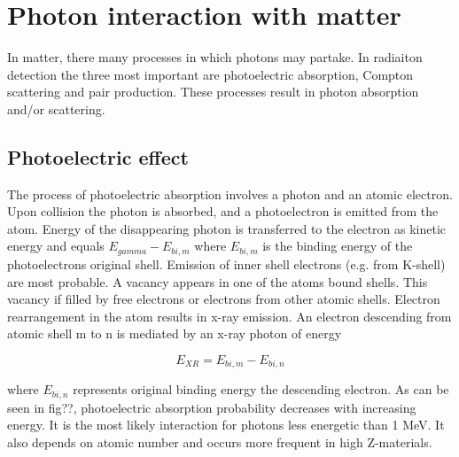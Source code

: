 \section{Photon interaction with matter}
In matter, there many processes in which photons may partake. In radiaiton detection the three most important are photoelectric absorption, Compton scattering and pair production. These processes result in photon absorption and/or scattering.

\subsection{Photoelectric effect}
The process of photoelectric absorption involves a photon and an atomic electron. Upon collision the photon is absorbed, and a photoelectron is emitted from the atom. Energy of the disappearing photon is transferred to the electron as kinetic energy and equals $E_{gamma}-E_{bi,m}$
where $E_{bi,m}$ is the binding energy of the photoelectrons original shell. Emission of inner shell electrons (e.g. from K-shell) are most probable.
A vacancy appears in one of the atoms bound shells. This vacancy if filled by free electrons or electrons from other atomic shells. Electron rearrangement in the atom results in x-ray emission. An electron descending from atomic shell m to n is mediated by an x-ray photon of energy

    \begin{equation}
    E_{XR}=E_{bi,m}-E_{bi,n}
    \end{equation}

where $E_{bi,n}$ represents original binding energy the descending electron.
As can be seen in fig??, photoelectric absorption probability decreases with increasing energy. It is the most likely interaction for photons less energetic than 1 MeV. It also depends on atomic number and occurs more frequent in high Z-materials.


